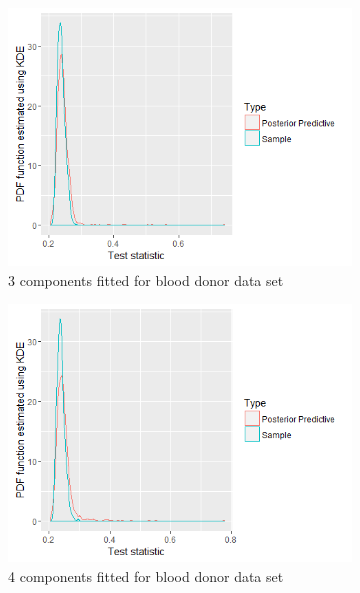 \begin{figure}[!htb]
\begin{subfigure}[b]{0.4\textwidth}
		\includegraphics[width=\textwidth]{mainmatter/chapter_6_blood_donor/ppc_3comp.png}	
          \caption{\label{fig : ppc_blood_donor_3comp}3 components fitted for blood donor data set}
	\end{subfigure}
	\begin{subfigure}[b]{0.4\textwidth}
		\includegraphics[width=\textwidth]{mainmatter/chapter_6_blood_donor/ppc_4comp.png}	
          \caption{\label{fig : ppc_blood_donor_4comp}4 components fitted for blood donor data set}
	\end{subfigure}
	\begin{subfigure}[b]{0.4\textwidth}

\end{subfigure}
\end{figure}
